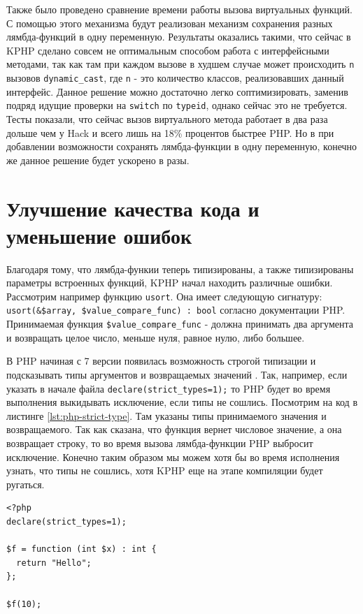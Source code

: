 Также было проведено сравнение времени работы вызова виртуальных функций.
С помощью этого механизма будут реализован механизм сохранения разных лямбда-функций в одну переменную.
Результаты оказались такими, что сейчас в KPHP сделано совсем не оптимальным способом работа с интерфейсными методами, так как там при каждом вызове в худшем случае может происходить \verb|n| вызовов \verb|dynamic_cast|, где \verb|n| - это количество классов, реализовавших данный интерфейс.
Данное решение можно достаточно легко соптимизировать, заменив подряд идущие проверки на \verb|switch| по \verb|typeid|\cite{fast-dynamic-cast}, однако сейчас это не требуется.
Тесты показали, что сейчас вызов виртуального метода работает в два раза дольше чем у Hack и всего лишь на 18\% процентов быстрее PHP.
Но в при добавлении возможности сохранять лямбда-функции в одну переменную, конечно же данное решение будет ускорено в разы.


\section{Улучшение качества кода и уменьшение ошибок}
Благодаря тому, что лямбда-функии теперь типизированы, а также типизированы параметры встроенных функций, KPHP начал находить различные ошибки.
Рассмотрим например функцию \verb|usort|.
Она имеет следующую сигнатуру: \verb|usort(&$array, $value_compare_func) : bool| согласно документации PHP.
Принимаемая функция \verb|$value_compare_func| - должна принимать два аргумента и возвращать целое число, меньше нуля, равное нулю, либо большее.

В PHP начиная с 7 версии появилась возможность строгой типизации и подсказывать типы аргументов и возвращаемых значений \cite{php-7-strict-types}.
Так, например, если указать в начале файла \verb|declare(strict_types=1);| то PHP будет во время выполнения выкидывать исключение, если типы не сошлись.
Посмотрим на код в листинге \ref{lst:php-strict-type}.
Там указаны типы принимаемого значения и возвращаемого.
Так как сказана, что функция вернет числовое значение, а она возвращает строку, то во время вызова лямбда-функции PHP выбросит исключение\cite{php-7-pitfalls}.
Конечно таким образом мы можем хотя бы во время исполнения узнать, что типы не сошлись, хотя KPHP еще на этапе компиляции будет ругаться.
\begin{lstlisting}[caption={Пример типизации в PHP7}, label={lst:php-strict-type}]
<?php
declare(strict_types=1);

$f = function (int $x) : int {
  return "Hello";
};

$f(10);
\end{lstlisting}

